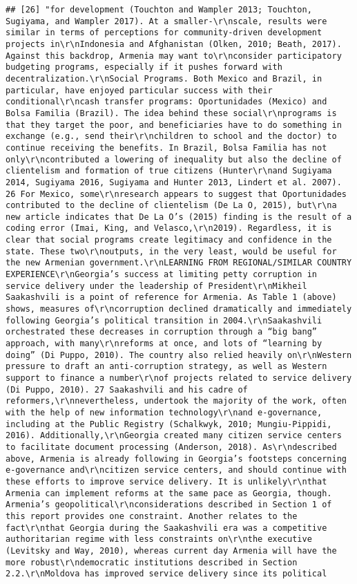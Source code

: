\documentclass[
]{article}
\begin{document}
\begin{verbatim}
## [26] "for development (Touchton and Wampler 2013; Touchton, Sugiyama, and Wampler 2017). At a smaller-\r\nscale, results were similar in terms of perceptions for community-driven development projects in\r\nIndonesia and Afghanistan (Olken, 2010; Beath, 2017). Against this backdrop, Armenia may want to\r\nconsider participatory budgeting programs, especially if it pushes forward with decentralization.\r\nSocial Programs. Both Mexico and Brazil, in particular, have enjoyed particular success with their conditional\r\ncash transfer programs: Oportunidades (Mexico) and Bolsa Familia (Brazil). The idea behind these social\r\nprograms is that they target the poor, and beneficiaries have to do something in exchange (e.g., send their\r\nchildren to school and the doctor) to continue receiving the benefits. In Brazil, Bolsa Familia has not only\r\ncontributed a lowering of inequality but also the decline of clientelism and formation of true citizens (Hunter\r\nand Sugiyama 2014, Sugiyama 2016, Sugiyama and Hunter 2013, Lindert et al. 2007). 26 For Mexico, some\r\nresearch appears to suggest that Oportunidades contributed to the decline of clientelism (De La O, 2015), but\r\na new article indicates that De La O’s (2015) finding is the result of a coding error (Imai, King, and Velasco,\r\n2019). Regardless, it is clear that social programs create legitimacy and confidence in the state. These two\r\noutputs, in the very least, would be useful for the new Armenian government.\r\nLEARNING FROM REGIONAL/SIMILAR COUNTRY EXPERIENCE\r\nGeorgia’s success at limiting petty corruption in service delivery under the leadership of President\r\nMikheil Saakashvili is a point of reference for Armenia. As Table 1 (above) shows, measures of\r\ncorruption declined dramatically and immediately following Georgia’s political transition in 2004.\r\nSaakashvili orchestrated these decreases in corruption through a “big bang” approach, with many\r\nreforms at once, and lots of “learning by doing” (Di Puppo, 2010). The country also relied heavily on\r\nWestern pressure to draft an anti-corruption strategy, as well as Western support to finance a number\r\nof projects related to service delivery (Di Puppo, 2010). 27 Saakashvili and his cadre of reformers,\r\nnevertheless, undertook the majority of the work, often with the help of new information technology\r\nand e-governance, including at the Public Registry (Schalkwyk, 2010; Mungiu-Pippidi, 2016). Additionally,\r\nGeorgia created many citizen service centers to facilitate document processing (Anderson, 2018). As\r\ndescribed above, Armenia is already following in Georgia’s footsteps concerning e-governance and\r\ncitizen service centers, and should continue with these efforts to improve service delivery. It is unlikely\r\nthat Armenia can implement reforms at the same pace as Georgia, though. Armenia’s geopolitical\r\nconsiderations described in Section 1 of this report provides one constraint. Another relates to the fact\r\nthat Georgia during the Saakashvili era was a competitive authoritarian regime with less constraints on\r\nthe executive (Levitsky and Way, 2010), whereas current day Armenia will have the more robust\r\ndemocratic institutions described in Section 2.2.\r\nMoldova has improved service delivery since its political 
\end{verbatim}
\end{document}
